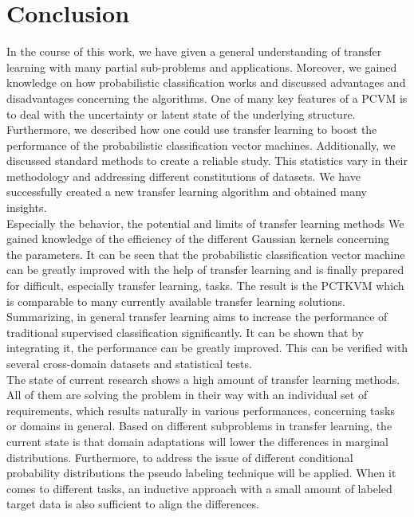 \chapter{Conclusion}\label{ConChap}	
In the course of this work, we have given a general understanding of transfer learning with many partial sub-problems and applications.
Moreover, we gained knowledge on how probabilistic classification works and discussed advantages and disadvantages concerning the algorithms.
One of many key features of a \acs{PCVM} is to deal with the uncertainty or latent state of the underlying structure.\\
Furthermore, we described how one could use transfer learning to boost the performance of the probabilistic classification vector machines.
Additionally, we discussed standard methods to create a reliable study.
This statistics vary in their methodology and addressing different constitutions of datasets.
We have successfully created a new transfer learning algorithm and obtained many insights.\\
Especially the behavior, the potential and limits of transfer learning methods
We gained knowledge of the efficiency of the different Gaussian kernels concerning the parameters.
It can be seen that the probabilistic classification vector machine can be greatly improved with the help of transfer learning and is finally prepared for difficult, especially transfer learning, tasks.
The result is the \acl{PCTKVM} which is comparable to many currently available transfer learning solutions.\\ 
Summarizing, in general transfer learning aims to increase the performance of traditional supervised classification significantly.
It can be shown that by integrating it, the performance can be greatly improved.
This can be verified with several cross-domain datasets and statistical tests.\\
The state of current research shows a high amount of transfer learning methods.\cite[p. 33]{Weiss.2016}
All of them are solving the problem in their way with an individual set of requirements, which results naturally in various performances, concerning tasks or domains in general.
Based on different subproblems in transfer learning, the current state is that domain adaptations will lower the differences in marginal distributions. Furthermore, to address the issue of different conditional probability distributions the pseudo labeling technique will be applied. When it comes to different tasks, an inductive approach with a small amount of labeled target data is also sufficient to align the differences.
